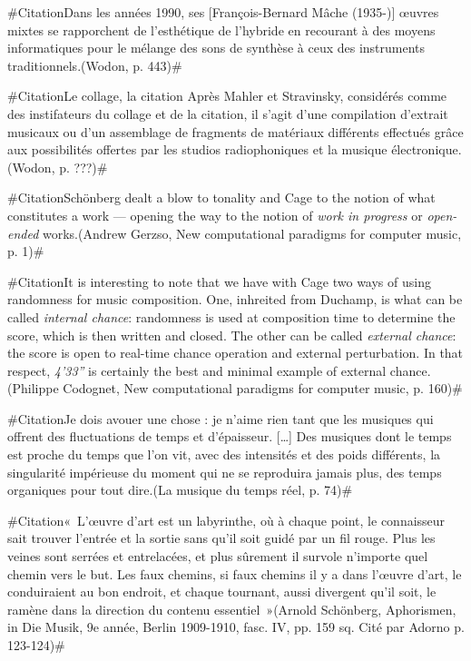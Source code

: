 \documentclass[a4paper,12pt]{article}
\newcommand{\guill}[1]{«~#1~»}
\newcommand{\zitat}[2]{\#Citation#1(#2)\#}
\begin{document}
\zitat{Dans les années 1990, ses [François-Bernard Mâche (1935-)] œuvres mixtes se rapporchent de l'esthétique de l'hybride en recourant à des moyens informatiques pour le mélange des sons de synthèse à ceux des instruments traditionnels.}
{Wodon, p. 443}

\zitat{Le collage, la citation
Après Mahler et Stravinsky, considérés comme des instifateurs du collage et de la citation, il s'agit d'une compilation d'extrait musicaux ou d'un assemblage de fragments de matériaux différents effectués grâce aux possibilités offertes par les studios radiophoniques et la musique électronique.}
{Wodon, p. ???}

\zitat{Schönberg dealt a blow to tonality and Cage to the notion of what constitutes a work --- opening the way to the notion of \emph{work in progress} or \emph{open-ended} works.}
{Andrew Gerzso, New computational paradigms for computer music, p. 1}

\zitat{It is interesting to note that we have with Cage two ways of using randomness for music composition. One, inhreited from Duchamp, is what can be called \emph{internal chance}: randomness is used at composition time to determine the score, which is then written and closed. The other can be called \emph{external chance}: the score is open to real-time chance operation and external perturbation. In that respect, \emph{4'33''} is certainly the best and minimal example of external chance.}
{Philippe Codognet, New computational paradigms for computer music, p. 160}

\zitat{Je dois avouer une chose : je n'aime rien tant que les musiques qui offrent des fluctuations de temps et d'épaisseur. [\dots] Des musiques dont le temps est proche du temps que l'on vit, avec des intensités et des poids différents, la singularité impérieuse du moment qui ne se reproduira jamais plus, des temps organiques pour tout dire.}
{La musique du temps réel, p. 74}

\zitat{\guill{L'œuvre d'art est un labyrinthe, où à chaque point, le connaisseur sait trouver l'entrée et la sortie sans qu'il soit guidé par un fil rouge. Plus les veines sont serrées et entrelacées, et plus sûrement il survole n'importe quel chemin vers le but. Les faux chemins, si faux chemins il y a dans l'œuvre d'art, le conduiraient au bon endroit, et chaque tournant, aussi divergent qu'il soit, le ramène dans la direction du contenu essentiel}}
{Arnold Schönberg, Aphorismen, in Die Musik, 9e année, Berlin 1909-1910, fasc. IV, pp. 159 sq.
Cité par Adorno p. 123-124}
\end{document}
